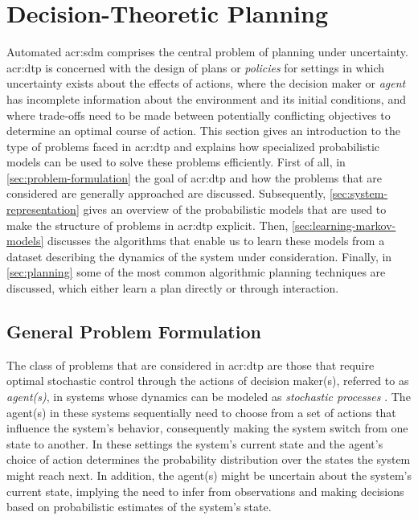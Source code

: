 \section{Decision-Theoretic Planning}
\label{sec:decision-theoretic-planning}

Automated \acrfull{acr:sdm} comprises the central problem of planning under uncertainty. 
\acrfull{acr:dtp} is concerned with the design of plans or \textit{policies} for settings in which uncertainty exists about the effects of actions, where the decision maker or \textit{agent} has incomplete information about the environment and its initial conditions, and where trade-offs need to be made between potentially conflicting objectives to determine an optimal course of action.
This section gives an introduction to the type of problems faced in \acrshort{acr:dtp} and explains how specialized probabilistic models can be used to solve these problems efficiently.
First of all, in \autoref{sec:problem-formulation} the goal of \acrshort{acr:dtp} and how the problems that are considered are generally approached are discussed.
Subsequently, \autoref{sec:system-representation} gives an overview of the probabilistic models that are used to make the structure of problems in \acrshort{acr:dtp} explicit.
Then, \autoref{sec:learning-markov-models} discusses the algorithms that enable us to learn these models from a dataset describing the dynamics of the system under consideration.
Finally, in \autoref{sec:planning} some of the most common algorithmic planning techniques are discussed, which either learn a plan directly or through interaction.

\subsection{General Problem Formulation}
\label{sec:problem-formulation}

The class of problems that are considered in \acrlong{acr:dtp} are those that require optimal stochastic control through the actions of decision maker(s), referred to as \textit{agent(s)}, in systems whose dynamics can be modeled as \textit{stochastic processes} \cite{Boutilier1999}.
The agent(s) in these systems sequentially need to choose from a set of actions that influence the system's behavior, consequently making the system switch from one state to another.
In these settings the system's current state and the agent's choice of action determines the probability distribution over the states the system might reach next.
In addition, the agent(s) might be uncertain about the system's current state, implying the need to infer from observations and making decisions based on probabilistic estimates of the system's state.

